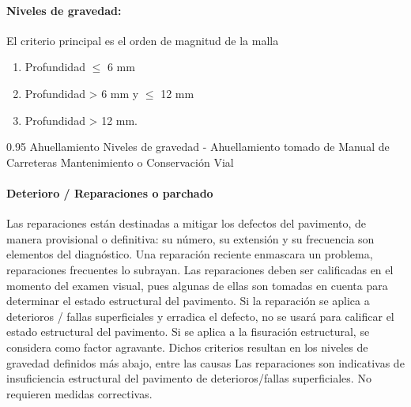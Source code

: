 	\paragraph*{Niveles de gravedad:} El criterio principal es el orden de magnitud de la malla 
	\begin{enumerate}
		\renewcommand{\labelenumi}{\alph{enumi})}
		\item Profundidad $\leq$ 6 mm
		\item Profundidad > 6 mm y $\leq$ 12 mm
		\item Profundidad > 12 mm.
	\end{enumerate}
	
	
	
	{%
		\begin{subfigure}[b]{0.5\textwidth}
			\centering
			\caption{}
			\label{def1}
		\end{subfigure}
		\hfill
		\begin{subfigure}[b]{0.5\textwidth}
			\centering
			\caption{}
			\label{def2}
		\end{subfigure}
		\hfil

	}
	{0.95}
	{Ahuellamiento}
	{Niveles de gravedad - Ahuellamiento tomado de Manual de Carreteras Mantenimiento o Conservación Vial}
	
\paragraph{Deterioro / Reparaciones o parchado}

	Las reparaciones están destinadas a mitigar los defectos del pavimento, de manera provisional o definitiva: su número, su extensión y su frecuencia son elementos del diagnóstico. Una reparación reciente enmascara un problema, reparaciones frecuentes lo subrayan. Las reparaciones deben ser calificadas en el momento del examen visual, pues algunas de ellas son tomadas en cuenta para determinar el estado estructural del pavimento. Si la reparación se aplica a deterioros / fallas superficiales y erradica el defecto, no se usará para calificar el estado estructural del pavimento. Si se aplica a la fisuración estructural, se considera como factor agravante. Dichos criterios resultan en los niveles de gravedad definidos más abajo, entre las causas Las reparaciones son indicativas de insuficiencia estructural del pavimento de deterioros/fallas superficiales. No requieren medidas correctivas.
